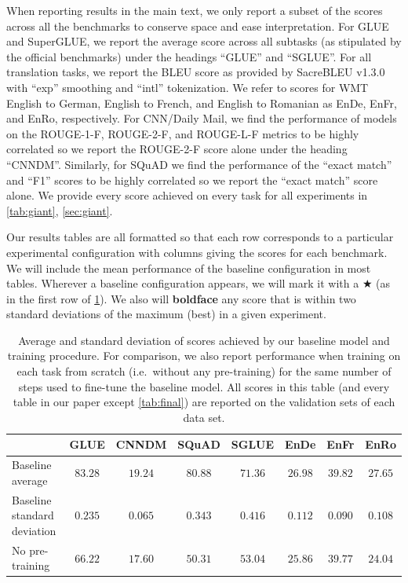 \documentclass[twoside,11pt]{article}
\newcommand{\bsl}{\makebox[0pt][r]{\raisebox{0.05em}{$\bigstar\,$}}}
\def\*#1{\mathbf{#1}}
\begin{document}
When reporting results in the main text, we only report a subset of the scores across all the benchmarks to conserve space and ease interpretation.
For GLUE and SuperGLUE, we report the average score across all subtasks (as stipulated by the official benchmarks) under the headings ``GLUE'' and ``SGLUE''.
For all translation tasks, we report the BLEU score \citep{papineni2002bleu} as provided by SacreBLEU v1.3.0 \citep{post2018call} with ``exp'' smoothing and ``intl'' tokenization.
We refer to scores for WMT English to German, English to French, and English to Romanian as EnDe, EnFr, and EnRo, respectively.
For CNN/Daily Mail, we find the performance of models on the ROUGE-1-F, ROUGE-2-F, and ROUGE-L-F metrics \citep{lin2004rouge} to be highly correlated so we report the ROUGE-2-F score alone under the heading ``CNNDM''.
Similarly, for SQuAD we find the performance of the ``exact match'' and ``F1'' scores to be highly correlated so we report the ``exact match'' score alone.
We provide every score achieved on every task for all experiments in \cref{tab:giant}, \cref{sec:giant}.

Our results tables are all formatted so that each row corresponds to a particular experimental configuration with columns giving the scores for each benchmark.
We will include the mean performance of the baseline configuration in most tables.
Wherever a baseline configuration appears, we will mark it with a $\bigstar$ (as in the first row of \cref{tab:baseline}).
We also will \textbf{boldface} any score that is within two standard deviations of the maximum (best) in a given experiment.

\begin{table}
\footnotesize
\centering
\begin{tabular}{l c c c c c c c}
\toprule
                                & GLUE        & CNNDM       & SQuAD       & SGLUE       & EnDe        & EnFr        & EnRo    \\
\midrule
    \bsl Baseline average       & $\*{83.28}$ & $\*{19.24}$ & $\*{80.88}$ & $\*{71.36}$ & $\*{26.98}$ & $\*{39.82}$ & $\*{27.65}$ \\
    Baseline standard deviation & $0.235$     & $0.065$     & $0.343$     & $0.416$     & $0.112$     & $0.090$     & $0.108$ \\
    No pre-training             & $66.22$     & $17.60$     & $50.31$     & $53.04$     & $25.86$     & $\*{39.77}$ & $24.04$ \\
\bottomrule
\end{tabular}
\caption{
Average and standard deviation of scores achieved by our baseline model and training procedure.
For comparison, we also report performance when training on each task from scratch (i.e.\ without any pre-training) for the same number of steps used to fine-tune the baseline model.
All scores in this table (and every table in our paper except \cref{tab:final}) are reported on the validation sets of each data set.
}
\label{tab:baseline}
\end{table}
\end{document}
